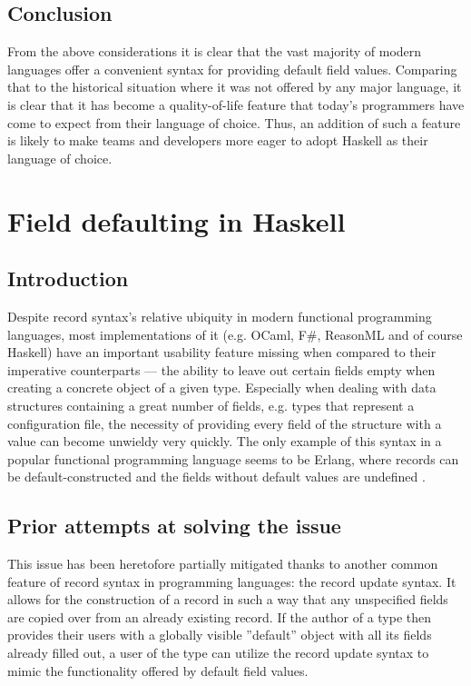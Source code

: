 \documentclass[en]{pracamgr}
\begin{document}
\subsection{Conclusion}
From the above considerations it is clear that the vast majority of modern languages 
offer a convenient syntax for providing default field values. 
Comparing that to the historical situation where it was not offered by any major language,
it is clear that it has become a quality-of-life feature 
that today's programmers have come to expect from their language of choice.
Thus, an addition of such a feature is likely to make teams and developers more eager to adopt Haskell as their language of choice.

\section{Field defaulting in Haskell}
\subsection{Introduction}
Despite record syntax's relative ubiquity in modern functional programming languages, most implementations
of it (e.g. OCaml, F\#, ReasonML and of course Haskell) have an important usability feature missing when compared
to their imperative counterparts --- the ability to leave out certain fields empty
when creating a concrete object of a given type. Especially when dealing with
data structures containing a great number of fields, e.g. types that represent
a configuration file, the necessity of providing every field 
of the structure with a value can become unwieldy very quickly. 
The only example of this syntax in a popular functional programming language seems to be Erlang,
where records can be default-constructed and the fields without default values are undefined \cite{ErlangRecords}.

\subsection{Prior attempts at solving the issue}\label{ss:prior}
This issue has been heretofore partially mitigated thanks to another common feature of record syntax in programming languages: the record update syntax. 
It allows for the construction of a record in such a way that any unspecified fields are copied over from an already existing record. 
If the author of a type then provides their users with a globally visible ''default'' object with all its fields already filled out, 
a user of the type can utilize the record update syntax to mimic the functionality offered by default field values.
\end{document}
